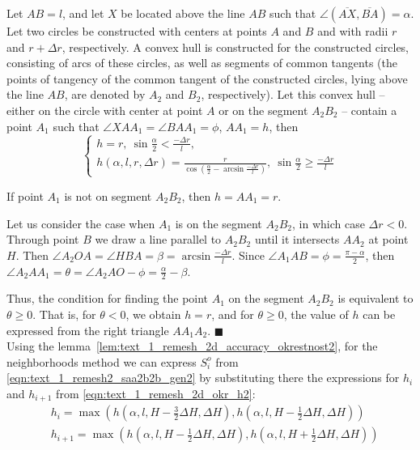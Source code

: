 \documentclass[
11pt,%
tightenlines,%
twoside,%
onecolumn,%
nofloats,%
nobibnotes,%
nofootinbib,%
superscriptaddress,%
noshowpacs,%
centertags]%
{revtex4}
\begin{document}
\begin{lemma}\label{lem:text_1_remesh_2d_accuracy_okrestnost2}
Let $AB = l$, and let $X$ be located above the line $AB$ such that $\angle (\overline{AX}, \overline{BA}) = \alpha$.
Let two circles be constructed with centers at points $A$ and $B$ and with radii $r$ and $r + \Delta r$, respectively.
A convex hull is constructed for the constructed circles, consisting of arcs of these circles, as well as segments of common tangents (the points of tangency of the common tangent of the constructed circles, lying above the line $AB$, are denoted by $A_2$ and $B_2$, respectively).
Let this convex hull -- either on the circle with center at point $A$ or on the segment $A_2B_2$ -- contain a point $A_1$ such that $\angle XAA_1 = \angle BAA_1 = \phi$, $AA_1 = h$, then
\begin{equation}
	\begin{cases}\label{eqn:text_1_remesh_2d_okr_h2}
		h = r, \ \sin \frac{\alpha}{2} < \frac{-\Delta r}{l}, \\
		h(\alpha, l, r, \Delta r) = \frac{r}{\cos \left( \frac{\alpha}{2} - \arcsin \frac{-\Delta r}{l} \right)}, \ \sin \frac{\alpha}{2} \ge \frac{-\Delta r}{l}
	\end{cases}
\end{equation}
\end{lemma}

If point $A_1$ is not on segment $A_2B_2$, then $h = AA_1 = r$.

Let us consider the case when $A_1$ is on the segment $A_2B_2$, in which case $\Delta r < 0$.
Through point $B$ we draw a line parallel to $A_2B_2$ until it intersects $AA_2$ at point $H$.
Then $\angle A_2OA = \angle HBA = \beta = \arcsin \frac{-\Delta r}{l}$.
Since $\angle A_1AB = \phi = \frac{\pi - \alpha}{2}$, then $\angle A_2AA_1 = \theta = \angle A_2AO - \phi = \frac{\alpha}{2} - \beta$.

Thus, the condition for finding the point $A_1$ on the segment $A_2B_2$ is equivalent to $\theta \ge 0$.
That is, for $\theta < 0$, we obtain $h = r$, and for $\theta \ge 0$, the value of $h$ can be expressed from the right triangle $AA_1A_2$.
$\blacksquare$\\

Using the lemma~\ref{lem:text_1_remesh_2d_accuracy_okrestnost2}, for the neighborhoods method we can express $S_i^o$ from \eqref{eqn:text_1_remesh2_saa2b2b_gen2} by substituting there the expressions for $h_i$ and $h_{i + 1}$ from \eqref{eqn:text_1_remesh_2d_okr_h2}:
\begin{equation}
	\begin{aligned}
	& h_i = \max \left( h \left( \alpha, l, H - \frac{3}{2}\Delta H, \Delta H \right), h \left( \alpha, l, H - \frac{1}{2}\Delta H, \Delta H \right) \right) \\
	& h_{i + 1} = \max \left( h \left( \alpha, l, H - \frac{1}{2}\Delta H, \Delta H \right), h \left( \alpha, l, H + \frac{1}{2}\Delta H, \Delta H \right) \right)
	\end{aligned}
\end{equation}
\end{document}
